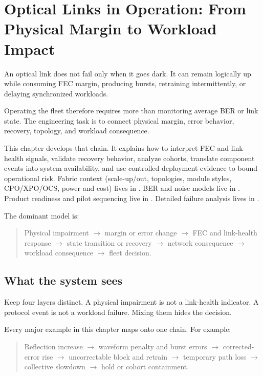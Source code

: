 \chapter{Optical Links in Operation: From Physical Margin to Workload Impact}
\label{ch:networking}

An optical link does not fail only when it goes dark. It can remain logically
up while consuming FEC margin, producing bursts, retraining intermittently, or
delaying synchronized workloads.

Operating the fleet therefore requires more than monitoring average BER or link
state. The engineering task is to connect physical margin, error behavior,
recovery, topology, and workload consequence.

This chapter develops that chain. It explains how to interpret FEC and
link-health signals, validate recovery behavior, analyze cohorts, translate
component events into system availability, and use controlled deployment
evidence to bound operational risk. Fabric context (scale-up/out, topologies,
module styles, CPO/XPO/OCS, power and cost) lives in
. BER and noise models live in
. Product readiness and pilot sequencing live in
. Detailed failure analysis lives in
.

The dominant model is:

\begin{quote}
\noindent Physical impairment
$\rightarrow$ margin or error change
$\rightarrow$ FEC and link-health response
$\rightarrow$ state transition or recovery
$\rightarrow$ network consequence
$\rightarrow$ workload consequence
$\rightarrow$ fleet decision.
\end{quote}

\section{What the system sees}
\label{sec:ops-what-system-sees}

Keep four layers distinct. A physical impairment is not a link-health
indicator. A protocol event is not a workload failure. Mixing them hides the
decision.

Every major example in this chapter maps onto one chain. For example:

\begin{quote}
\noindent Reflection increase
$\rightarrow$ waveform penalty and burst errors
$\rightarrow$ corrected-error rise
$\rightarrow$ uncorrectable block and retrain
$\rightarrow$ temporary path loss
$\rightarrow$ collective slowdown
$\rightarrow$ hold or cohort containment.
\end{quote}

